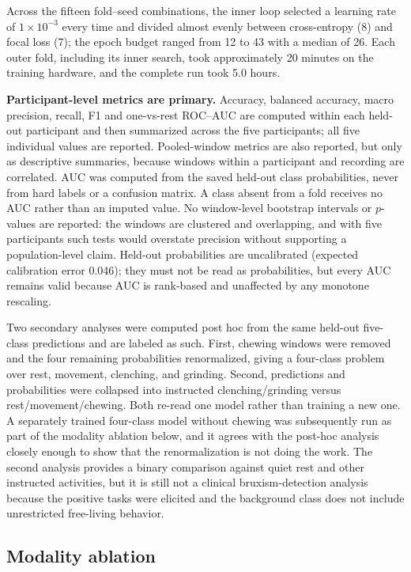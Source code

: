 \documentclass[pdflatex,sn-nature,iicol]{sn-jnl}
\begin{document}
Across the fifteen fold--seed combinations, the inner loop selected a learning rate of $1\times10^{-3}$ every time and divided almost evenly between cross-entropy (8) and focal loss (7); the epoch budget ranged from 12 to 43 with a median of 26. Each outer fold, including its inner search, took approximately 20 minutes on the training hardware, and the complete run took 5.0 hours.

\textbf{Participant-level metrics are primary.} Accuracy, balanced accuracy, macro precision, recall, F1 and one-vs-rest ROC--AUC are computed within each held-out participant and then summarized across the five participants; all five individual values are reported. Pooled-window metrics are also reported, but only as descriptive summaries, because windows within a participant and recording are correlated. AUC was computed from the saved held-out class probabilities, never from hard labels or a confusion matrix. A class absent from a fold receives no AUC rather than an imputed value. No window-level bootstrap intervals or $p$-values are reported: the windows are clustered and overlapping, and with five participants such tests would overstate precision without supporting a population-level claim. Held-out probabilities are uncalibrated (expected calibration error 0.046); they must not be read as probabilities, but every AUC remains valid because AUC is rank-based and unaffected by any monotone rescaling.

Two secondary analyses were computed post hoc from the same held-out five-class predictions and are labeled as such. First, chewing windows were removed and the four remaining probabilities renormalized, giving a four-class problem over rest, movement, clenching, and grinding. Second, predictions and probabilities were collapsed into instructed clenching/grinding versus rest/movement/chewing. Both re-read one model rather than training a new one. A separately trained four-class model without chewing was subsequently run as part of the modality ablation below, and it agrees with the post-hoc analysis closely enough to show that the renormalization is not doing the work. The second analysis provides a binary comparison against quiet rest and other instructed activities, but it is still not a clinical bruxism-detection analysis because the positive tasks were elicited and the background class does not include unrestricted free-living behavior.

\subsection{Modality ablation}
\end{document}
